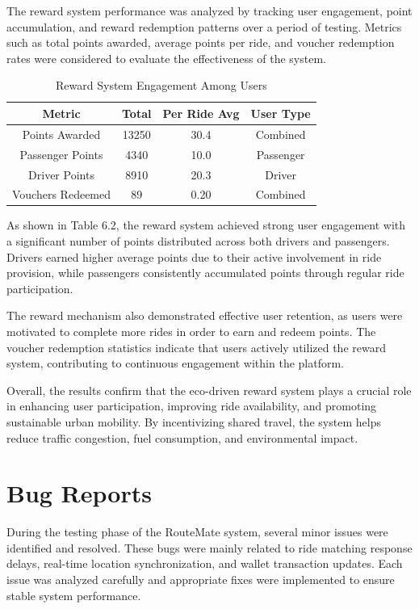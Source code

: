 \documentclass[10pt,a4paper]{report}
\begin{document}
\justify\large The reward system performance was analyzed by tracking user engagement,
point accumulation, and reward redemption patterns over a period of testing.
Metrics such as total points awarded, average points per ride, and voucher
redemption rates were considered to evaluate the effectiveness of the system.

\begin{table}[h]
\centering
\begin{tabular}{|c|c|c|c|}
\hline
\textbf{Metric} & \textbf{Total} & \textbf{Per Ride Avg} & \textbf{User Type} \\
\hline
Points Awarded & 13250 & 30.4 & Combined \\
\hline
Passenger Points & 4340 & 10.0 & Passenger \\
\hline
Driver Points & 8910 & 20.3 & Driver \\
\hline
Vouchers Redeemed & 89 & 0.20 & Combined \\
\hline
\end{tabular}
\caption{Reward System Engagement Among Users}
\end{table}

\justify\large As shown in Table 6.2, the reward system achieved strong user engagement
with a significant number of points distributed across both drivers and passengers.
Drivers earned higher average points due to their active involvement in ride provision,
while passengers consistently accumulated points through regular ride participation.

\justify\large The reward mechanism also demonstrated effective user retention, as
users were motivated to complete more rides in order to earn and redeem points.
The voucher redemption statistics indicate that users actively utilized the reward
system, contributing to continuous engagement within the platform.

\justify\large Overall, the results confirm that the eco-driven reward system plays a
crucial role in enhancing user participation, improving ride availability, and
promoting sustainable urban mobility. By incentivizing shared travel, the system
helps reduce traffic congestion, fuel consumption, and environmental impact.

\section{Bug Reports}

\justify\large During the testing phase of the RouteMate system, several minor issues were identified and resolved.
These bugs were mainly related to ride matching response delays, real-time location synchronization, and
wallet transaction updates. Each issue was analyzed carefully and appropriate fixes were implemented
to ensure stable system performance.
\end{document}
